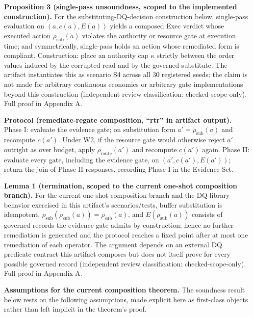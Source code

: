 \documentclass[11pt,a4paper]{article}
\theoremstyle{definition}
\newcommand{\rhosub}{\rho_{\mathrm{sub}}}
\newcommand{\rhoroute}{\rho_{\mathrm{route}}}
\begin{document}
\noindent\textbf{Proposition 3 (single-pass unsoundness, scoped to the implemented construction).} For the substituting-DQ-decision construction below, single-pass evaluation on $(a, c(a), E(a))$ yields a composed Exec verdict whose executed action $\rhosub(a)$ violates the authority or resource gate at execution time; and symmetrically, single-pass holds an action whose remediated form is compliant. Construction: place an authority cap $\kappa$ strictly between the order values induced by the corrupted read and by the governed substitute. The artifact instantiates this as scenario S4 across all 30 registered seeds; the claim is not made for arbitrary continuous economics or arbitrary gate implementations beyond this construction (independent review classification: checked-scope-only). Full proof in Appendix A.

\noindent\textbf{Protocol (remediate-regate composition, ``rtr'' in artifact output).} Phase I: evaluate the evidence gate; on substitution form $a' = \rhosub(a)$ and recompute $c(a')$. Under W2, if the resource gate would otherwise reject $a'$ outright as over budget, apply $\rhoroute(a')$ and recompute $c(a')$ again. Phase II: evaluate every gate, including the evidence gate, on $(a', c(a'), E(a'))$; return the join of Phase II responses, recording Phase I in the Evidence Set.

\noindent\textbf{Lemma 1 (termination, scoped to the current one-shot composition branch).} For the current one-shot composition branch and the DQ-library behavior exercised in this artifact's scenarios/tests, buffer substitution is idempotent, $\rhosub(\rhosub(a)) = \rhosub(a)$, and $E(\rhosub(a))$ consists of governed records the evidence gate admits by construction; hence no further remediation is generated and the protocol reaches a fixed point after at most one remediation of each operator. The argument depends on an external DQ predicate contract this artifact composes but does not itself prove for every possible governed record (independent review classification: checked-scope-only). Full proof in Appendix A.

\noindent\textbf{Assumptions for the current composition theorem.} The soundness result below rests on the following assumptions, made explicit here as first-class objects rather than left implicit in the theorem's proof.
\end{document}
